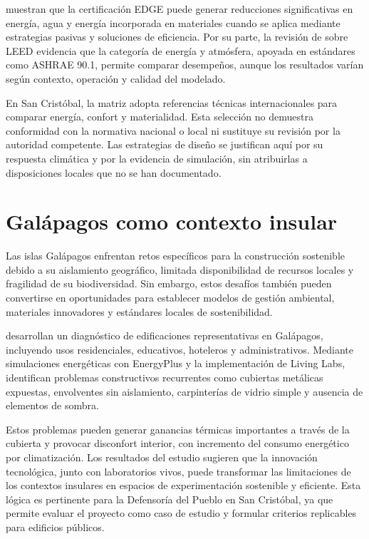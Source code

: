 \begin{textoDosTercios}

\textcite{isimbiAnalysisEDGECertification2022} muestran que la certificación EDGE puede generar reducciones significativas en energía, agua y energía incorporada en materiales cuando se aplica mediante estrategias pasivas y soluciones de eficiencia. Por su parte, la revisión de \textcite{ribeiroLEEDCertificationBuilding} sobre LEED evidencia que la categoría de energía y atmósfera, apoyada en estándares como ASHRAE 90.1, permite comparar desempeños, aunque los resultados varían según contexto, operación y calidad del modelado.

En San Cristóbal, la matriz adopta referencias técnicas internacionales para comparar energía, confort y materialidad. Esta selección no demuestra conformidad con la normativa nacional o local ni sustituye su revisión por la autoridad competente. Las estrategias de diseño se justifican aquí por su respuesta climática y por la evidencia de simulación, sin atribuirlas a disposiciones locales que no se han documentado.

\end{textoDosTercios}


\section{Galápagos como contexto insular}

\begin{textoDosTercios}

Las islas Galápagos enfrentan retos específicos para la construcción sostenible debido a su aislamiento geográfico, limitada disponibilidad de recursos locales y fragilidad de su biodiversidad. Sin embargo, estos desafíos también pueden convertirse en oportunidades para establecer modelos de gestión ambiental, materiales innovadores y estándares locales de sostenibilidad.

\textcite{torres-barriusoSustainableBuildingStandards2025} desarrollan un diagnóstico de edificaciones representativas en Galápagos, incluyendo usos residenciales, educativos, hoteleros y administrativos. Mediante simulaciones energéticas con EnergyPlus y la implementación de Living Labs, identifican problemas constructivos recurrentes como cubiertas metálicas expuestas, envolventes sin aislamiento, carpinterías de vidrio simple y ausencia de elementos de sombra.

Estos problemas pueden generar ganancias térmicas importantes a través de la cubierta y provocar disconfort interior, con incremento del consumo energético por climatización. Los resultados del estudio sugieren que la innovación tecnológica, junto con laboratorios vivos, puede transformar las limitaciones de los contextos insulares en espacios de experimentación sostenible y eficiente. Esta lógica es pertinente para la Defensoría del Pueblo en San Cristóbal, ya que permite evaluar el proyecto como caso de estudio y formular criterios replicables para edificios públicos.

\end{textoDosTercios}


